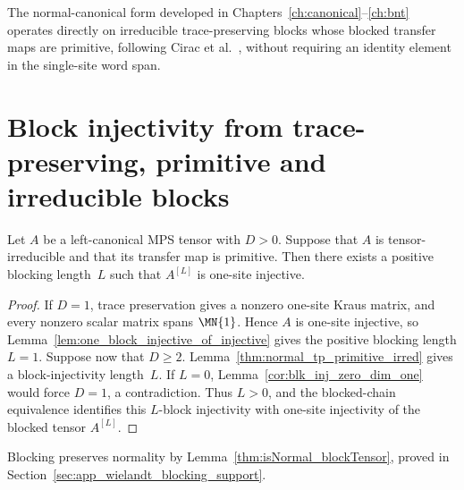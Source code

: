 \begin{remark}\label{rem:d1_bypasses_aperiodicity}
    The normal-canonical form developed in
    Chapters~\ref{ch:canonical}--\ref{ch:bnt} operates directly on irreducible
    trace-preserving blocks whose blocked transfer maps are primitive, following
    Cirac et al.~\cite{Cirac2016MPDO_arXiv}, without requiring an identity element
    in the single-site word span.
\end{remark}

\section{Block injectivity from trace-preserving, primitive and irreducible blocks}%
\label{sec:ch07_block_inj_from_tp_primitive_irred}

\begin{lemma}%
    \label{thm:tp_primitive_irred_block_injective}
    \leanok
    Let $A$ be a left-canonical MPS tensor with $D>0$.
    Suppose that $A$ is tensor-irreducible and that its transfer map is
    primitive.
    Then there exists a positive blocking length~$L$ such that
    $A^{[L]}$ is one-site injective.
\end{lemma}

\begin{proof}\leanok
    If $D=1$, trace preservation gives a nonzero one-site Kraus matrix, and
    every nonzero scalar matrix spans $\MN{1}$.
    Hence $A$ is one-site injective, so
    Lemma~\ref{lem:one_block_injective_of_injective} gives the positive
    blocking length $L=1$.
    Suppose now that $D\ge2$.
    Lemma~\ref{thm:normal_tp_primitive_irred} gives a
    block-injectivity length~$L$.
    If $L=0$, Lemma~\ref{cor:blk_inj_zero_dim_one} would force $D=1$,
    a contradiction.
    Thus $L>0$, and the blocked-chain equivalence identifies this
    $L$-block injectivity with one-site injectivity of the blocked tensor
    $A^{[L]}$.
\end{proof}

\begin{remark}
    Blocking preserves normality by Lemma~\ref{thm:isNormal_blockTensor},
    proved in Section~\ref{sec:app_wielandt_blocking_support}.
\end{remark}
